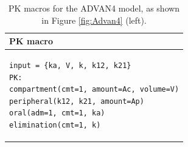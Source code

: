 \begin{table}[h!]
\setlength{\tabcolsep}{15pt}
\begin{center}
\begin{tabular}{l}
  \hline \hline
PK macro  \\[-.25ex]
  \hline
\lstset{language=NONMEMdataSet}
\begin{lstlisting}
input = {ka, V, k, k12, k21}
PK:
compartment(cmt=1, amount=Ac, volume=V)
peripheral(k12, k21, amount=Ap)
oral(adm=1, cmt=1, ka)
elimination(cmt=1, k)
\end{lstlisting}
\\
  \hline
\end{tabular}
\caption{PK macros  for the ADVAN4 model, as shown in Figure \ref{fig:Advan4} (left).}
\label{tab:advan4Table}
\end{center}
\end{table}


